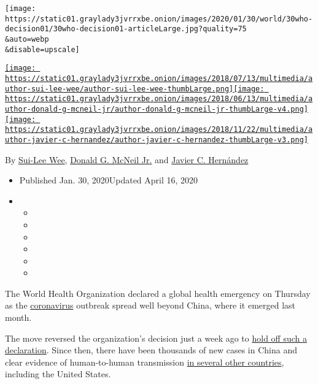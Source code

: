 \texttt{[image: https://static01.graylady3jvrrxbe.onion/images/2020/01/30/world/30who-decision01/30who-decision01-articleLarge.jpg?quality=75\\\&auto=webp\\\&disable=upscale]}

\href{https://www.nytimes3xbfgragh.onion/by/sui-lee-wee}{\texttt{[image: https://static01.graylady3jvrrxbe.onion/images/2018/07/13/multimedia/author-sui-lee-wee/author-sui-lee-wee-thumbLarge.png]}}\href{https://www.nytimes3xbfgragh.onion/by/donald-g-mcneil-jr}{\texttt{[image: https://static01.graylady3jvrrxbe.onion/images/2018/06/13/multimedia/author-donald-g-mcneil-jr/author-donald-g-mcneil-jr-thumbLarge-v4.png]}}\href{https://www.nytimes3xbfgragh.onion/by/javier-c-hernandez}{\texttt{[image: https://static01.graylady3jvrrxbe.onion/images/2018/11/22/multimedia/author-javier-c-hernandez/author-javier-c-hernandez-thumbLarge-v3.png]}}

By \href{https://www.nytimes3xbfgragh.onion/by/sui-lee-wee}{Sui-Lee
Wee},
\href{https://www.nytimes3xbfgragh.onion/by/donald-g-mcneil-jr}{Donald
G. McNeil Jr.} and
\href{https://www.nytimes3xbfgragh.onion/by/javier-c-hernandez}{Javier
C. Hernández}

\begin{itemize}
\item
  Published Jan. 30, 2020Updated April 16, 2020
\item
  \begin{itemize}
  \item
  \item
  \item
  \item
  \item
  \item
  \end{itemize}
\end{itemize}

The World Health Organization declared a global health emergency on
Thursday as the
\href{https://www.nytimes3xbfgragh.onion/2020/04/16/health/WHO-Trump-coronavirus.html}{coronavirus}
outbreak spread well beyond China, where it emerged last month.

The move reversed the organization's decision just a week ago to
\href{https://www.nytimes3xbfgragh.onion/2020/01/23/health/china-virus-who-emergency.html}{hold
off such a declaration}. Since then, there have been thousands of new
cases in China and clear evidence of human-to-human transmission
\href{https://www.nytimes3xbfgragh.onion/2020/01/29/health/china-coronavirus-outbreak.html}{in
several other countries}, including the United States.

